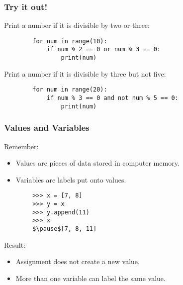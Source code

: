 \documentclass[notes]{beamer}
\begin{document}
	\begin{frame}[fragile]
		\frametitle{Try it out!}

		Print a number if it is divisible by two or three:

		\begin{lstlisting}
		for num in range(10):
		    if num % 2 == 0 or num % 3 == 0:
		        print(num)
		\end{lstlisting}

		Print a number if it is divisible by three but not five:

		\begin{lstlisting}
		for num in range(20):
		    if num % 3 == 0 and not num % 5 == 0:
		        print(num)
		\end{lstlisting}
	\end{frame}
	
	\begin{frame}[fragile]
		\frametitle{Values and Variables}
		Remember:
		\begin{itemize}
			\item Values are pieces of data stored in computer memory.
			\item Variables are labels put onto values.
		\end{itemize}
		
		\pause
		
		\begin{lstlisting}
		>>> x = [7, 8]
		>>> y = x
		>>> y.append(11)
		>>> x
		$\pause$[7, 8, 11]
		\end{lstlisting}
		
		Result:
		\begin{itemize}
			\item Assignment does not create a new value.
			\item More than one variable can label the same value.
		\end{itemize}
	\end{frame}
	
\end{document}
